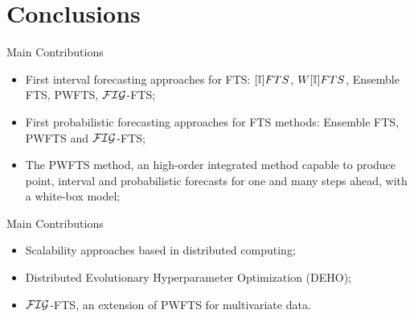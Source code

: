 \documentclass{beamer}
\begin{document}
\section{Conclusions}


\begin{frame}{Main Contributions}
\linespread{2}
\begin{itemize}
    \item First interval forecasting approaches for FTS: $[\mathbb{I}]FTS$, $W[\mathbb{I}]FTS$, Ensemble FTS, PWFTS, $\mathcal{FIG}$-FTS;
    \item First probabilistic forecasting approaches for FTS methods:  Ensemble FTS, PWFTS and $\mathcal{FIG}$-FTS; 
    \item The PWFTS method, an high-order integrated method capable to produce point, interval and probabilistic forecasts for one and many steps ahead, with a white-box model;
\end{itemize}
\end{frame}

\note[itemize]{
\item 
}

\begin{frame}{Main Contributions}
\linespread{2}
\begin{itemize}
    \item Scalability approaches based in distributed computing;
    \item Distributed Evolutionary Hyperparameter Optimization (DEHO);
    \item $\mathcal{FIG}$-FTS, an extension of PWFTS for multivariate data. 
\end{itemize}
\end{frame}

\end{document}
